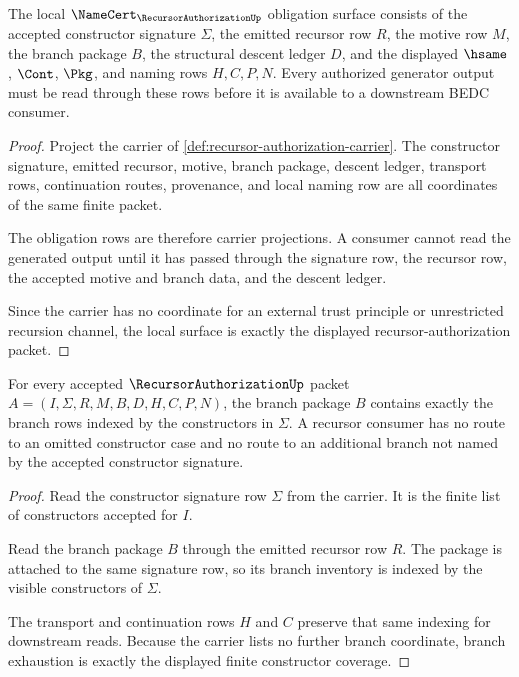 \begin{theorem}
\label{thm:recursor-authorization-namecert-obligations}
The local $\NameCert_{\RecursorAuthorizationUp}$ obligation surface consists of the accepted constructor signature $\Sigma$, the emitted recursor row $R$, the motive row $M$, the branch package $B$, the structural descent ledger $D$, and the displayed $\hsame$, $\Cont$, $\Pkg$, and naming rows $H,C,P,N$. Every authorized generator output must be read through these rows before it is available to a downstream BEDC consumer.
\end{theorem}
\begin{proof}
Project the carrier of \autoref{def:recursor-authorization-carrier}. The constructor signature, emitted recursor, motive, branch package, descent ledger, transport rows, continuation routes, provenance, and local naming row are all coordinates of the same finite packet.

The obligation rows are therefore carrier projections. A consumer cannot read the generated output until it has passed through the signature row, the recursor row, the accepted motive and branch data, and the descent ledger.

Since the carrier has no coordinate for an external trust principle or unrestricted recursion channel, the local \NameCert{} surface is exactly the displayed recursor-authorization packet.
\end{proof}

\begin{theorem}
\label{thm:recursor-authorization-branch-exhaustion}
For every accepted $\RecursorAuthorizationUp$ packet $A=(I,\Sigma,R,M,B,D,H,C,P,N)$, the branch package $B$ contains exactly the branch rows indexed by the constructors in $\Sigma$. A recursor consumer has no route to an omitted constructor case and no route to an additional branch not named by the accepted constructor signature.
\end{theorem}
\begin{proof}
Read the constructor signature row $\Sigma$ from the carrier. It is the finite list of constructors accepted for $I$.

Read the branch package $B$ through the emitted recursor row $R$. The package is attached to the same signature row, so its branch inventory is indexed by the visible constructors of $\Sigma$.

The transport and continuation rows $H$ and $C$ preserve that same indexing for downstream reads. Because the carrier lists no further branch coordinate, branch exhaustion is exactly the displayed finite constructor coverage.
\end{proof}

